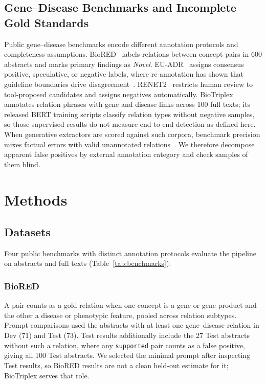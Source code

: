 \documentclass[preprint,10pt,letterpaper]{elsarticle}
\newcommand{\st}[1]{\texttt{#1}}             %
\begin{document}
\subsection{Gene--Disease Benchmarks and Incomplete Gold Standards}
Public gene--disease benchmarks encode different annotation protocols and completeness assumptions. BioRED~\cite{luo2022biored} labels relations between concept pairs in 600 abstracts and marks primary findings as \emph{Novel}. EU-ADR~\cite{vanmulligen2012euadr} assigns consensus positive, speculative, or negative labels, where re-annotation has shown that guideline boundaries drive disagreement~\cite{li2015crowdsourcing}. RENET2~\cite{su2021renet2} restricts human review to tool-proposed candidates and assigns negatives automatically. BioTriplex~\cite{collins2026biotriplex} annotates relation phrases with gene and disease links across 100 full texts; its released BERT training scripts classify relation types without negative samples, so those supervised results do not measure end-to-end detection as defined here. When generative extractors are scored against such corpora, benchmark precision mixes factual errors with valid unannotated relations~\cite{wadhwa2023revisiting,fan2024evaluating}. We therefore decompose apparent false positives by external annotation category and check samples of them blind.

\section{Methods}

\subsection{Datasets}
Four public benchmarks with distinct annotation protocols evaluate the pipeline on abstracts and full texts (Table~\ref{tab:benchmarks}).

\subsubsection{BioRED}
A pair counts as a gold relation when one concept is a gene or gene product and the other a disease or phenotypic feature, pooled across relation subtypes. Prompt comparisons used the abstracts with at least one gene--disease relation in Dev (71) and Test (73). Test results additionally include the 27 Test abstracts without such a relation, where any \st{supported} pair counts as a false positive, giving all 100 Test abstracts. We selected the minimal prompt after inspecting Test results, so BioRED results are not a clean held-out estimate for it; BioTriplex serves that role.
\end{document}
